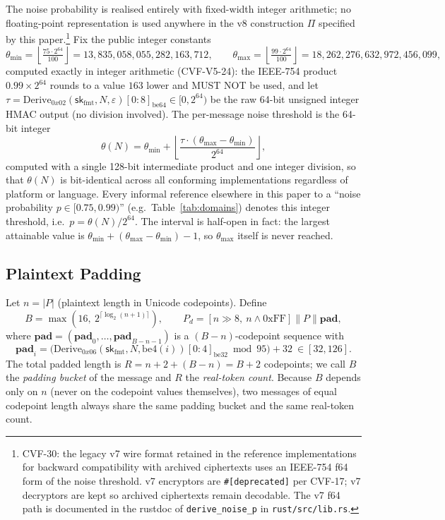 \documentclass[11pt,a4paper]{article}
\begin{document}
The noise probability is realised entirely with fixed-width integer
arithmetic; no floating-point representation is used anywhere in the v8
construction $\Pi$ specified by this paper.\footnote{CVF-30: the legacy v7
wire format retained in the reference implementations for backward
compatibility with archived ciphertexts uses an IEEE-754 f64 form of the
noise threshold. v7 encryptors are \texttt{\#[deprecated]} per CVF-17; v7
decryptors are kept so archived ciphertexts remain decodable. The v7 f64
path is documented in the rustdoc of \texttt{derive\_noise\_p} in
\texttt{rust/src/lib.rs}.} Fix the public integer constants
\[
  \theta_{\min} = \left\lfloor \tfrac{75 \cdot 2^{64}}{100} \right\rfloor = 13{,}835{,}058{,}055{,}282{,}163{,}712, \qquad
  \theta_{\max} = \left\lfloor \tfrac{99 \cdot 2^{64}}{100} \right\rfloor = 18{,}262{,}276{,}632{,}972{,}456{,}099,
\]
computed exactly in integer arithmetic (CVF-V5-24): the IEEE-754 product
$0.99\times2^{64}$ rounds to a value $163$ lower and MUST NOT be used,
and let $\tau = \mathrm{Derive}_{0x02}(\mathsf{sk}_{\mathrm{fmt}}, N, \varepsilon)[0:8]_{\mathrm{be64}} \in [0, 2^{64})$
be the raw 64-bit unsigned integer HMAC output (no division involved).
The per-message noise threshold is the 64-bit integer
\[
  \theta(N) = \theta_{\min} + \left\lfloor \frac{\tau \cdot (\theta_{\max} - \theta_{\min})}{2^{64}} \right\rfloor,
\]
computed with a single 128-bit intermediate product and one integer
division, so that $\theta(N)$ is bit-identical across all conforming
implementations regardless of platform or language. Every informal
reference elsewhere in this paper to a ``noise probability $p \in
[0.75, 0.99)$'' (e.g.\ Table~\ref{tab:domains}) denotes this integer
threshold, i.e.\ $p = \theta(N)/2^{64}$. The interval is half-open in fact:
the largest attainable value is $\theta_{\min}+(\theta_{\max}-\theta_{\min})-1$,
so $\theta_{\max}$ itself is never reached.

\subsection{Plaintext Padding}
\label{sec:padding}

Let $n = \lvert P \rvert$ (plaintext length in Unicode codepoints). Define
\[
  B = \max(16,\ 2^{\lceil \log_2(n+1) \rceil}), \qquad P_d = [n \gg 8,\ n \wedge \mathrm{0xFF}] \| P \| \mathbf{pad},
\]
where $\mathbf{pad} = (\mathbf{pad}_0, \ldots, \mathbf{pad}_{B-n-1})$ is a
$(B-n)$-codepoint sequence with
\[
  \mathbf{pad}_{i} = \bigl(\mathrm{Derive}_{0x06}(\mathsf{sk}_{\mathrm{fmt}}, N, \mathrm{be4}(i))[0{:}4]_{\mathrm{be32}} \bmod 95\bigr) + 32 \ \in [32,126].
\]
The total padded length is $R = n + 2 + (B-n) = B+2$ codepoints; we call
$B$ the \emph{padding bucket} of the message and $R$ the \emph{real-token
count}. Because $B$ depends only on $n$ (never on the codepoint values
themselves), two messages of equal codepoint length always share the same
padding bucket and the same real-token count.
\end{document}

